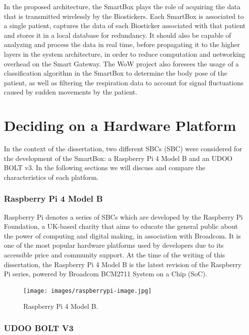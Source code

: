 
In the proposed architecture, the SmartBox plays the role of acquiring the data that is transmitted wirelessly by the Biostickers.
Each SmartBox is associated to a single patient, captures the data of each Biosticker associated with that patient and stores it in a local database for redundancy. 
It should also be capable of analyzing and process the data in real time, before propagating it to the higher layers in the system architecture, in order to reduce computation and networking overhead on the Smart Gateway. The \acs{WoW} project also foresees the usage of a classification algorithm in the SmartBox to determine the body pose of the patient, as well as filtering the respiration data to account for signal fluctuations caused by sudden movements by the patient.  

\section{Deciding on a Hardware Platform}

In the context of the dissertation, two different \acl{SBC}s (\acs{SBC}) were considered for the development of the SmartBox: a Raspberry Pi 4 Model B and an UDOO BOLT v3. In the following sections we will discuss and compare the characteristics of each platform. 

\subsubsection{Raspberry Pi 4 Model B}

Raspberry Pi denotes a series of \acs{SBC}s which are developed by the Raspberry Pi Foundation, a UK-based charity that aims to educate the general public about the power of computing and digital making, in association with Broadcom. It is one of the most popular hardware platforms used by developers due to its accessible price and community support.
At the time of the writing of this dissertation, the Raspberry Pi 4 Model B is the latest revision of the Raspberry Pi series, powered by Broadcom BCM2711 System on a Chip (SoC).

\begin{figure}[H]
    \centering
    \texttt{[image: images/raspberrypi-image.jpg]}
    \caption{Raspberry Pi 4 Model B.}
    \label{fig:raspberrypi-image}
\end{figure}

\subsubsection{UDOO BOLT V3}

